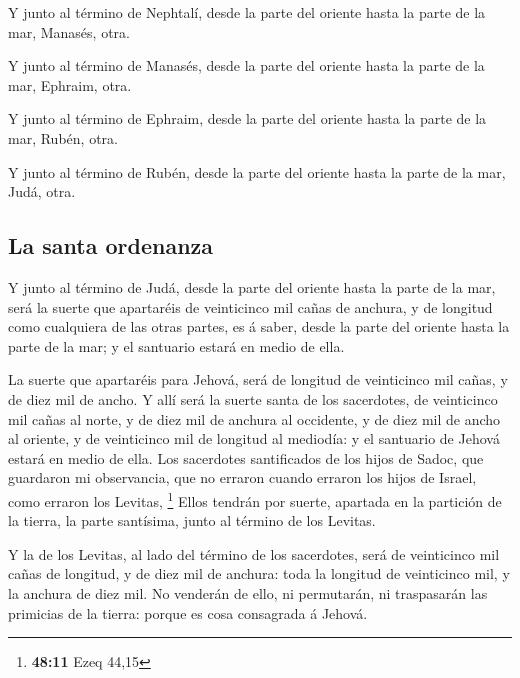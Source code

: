  Y junto al término de Nephtalí, desde la parte del oriente
hasta la parte de la mar, Manasés, otra.

 Y junto al término de Manasés, desde la parte del oriente
hasta la parte de la mar, Ephraim, otra.

 Y junto al término de Ephraim, desde la parte del oriente
hasta la parte de la mar, Rubén, otra.

 Y junto al término de Rubén, desde la parte del oriente
hasta la parte de la mar, Judá, otra.

\hypertarget{la-santa-ordenanza}{%
\subsection{La santa ordenanza}\label{la-santa-ordenanza}}

 Y junto al término de Judá, desde la parte del oriente
hasta la parte de la mar, será la suerte que apartaréis de veinticinco
mil cañas de anchura, y de longitud como cualquiera de las otras partes,
es á saber, desde la parte del oriente hasta la parte de la mar; y el
santuario estará en medio de ella.

 La suerte que apartaréis para Jehová, será de longitud de
veinticinco mil cañas, y de diez mil de ancho.  Y allí será
la suerte santa de los sacerdotes, de veinticinco mil cañas al norte, y
de diez mil de anchura al occidente, y de diez mil de ancho al oriente,
y de veinticinco mil de longitud al mediodía: y el santuario de Jehová
estará en medio de ella.  Los sacerdotes santificados de
los hijos de Sadoc, que guardaron mi observancia, que no erraron cuando
erraron los hijos de Israel, como erraron los Levitas, \footnote{\textbf{48:11}
  Ezeq 44,15}  Ellos tendrán por suerte, apartada en la
partición de la tierra, la parte santísima, junto al término de los
Levitas.

 Y la de los Levitas, al lado del término de los
sacerdotes, será de veinticinco mil cañas de longitud, y de diez mil de
anchura: toda la longitud de veinticinco mil, y la anchura de diez mil.
 No venderán de ello, ni permutarán, ni traspasarán las
primicias de la tierra: porque es cosa consagrada á Jehová.

